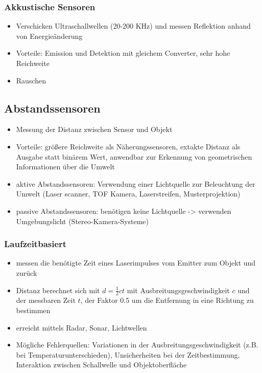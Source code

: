\documentclass[paper=a4, fontsize=11pt]{scrartcl} %
\numberwithin{equation}{section} %
\numberwithin{figure}{section} %
\numberwithin{table}{section} %
\begin{document}
\subsubsection{Akkustische Sensoren}

\begin{itemize}
\item Verschicken Ultraschallwellen (20-200 KHz) und messen Reflektion anhand von Energieänderung
\item Vorteile: Emission und Detektion mit gleichem Converter, sehr hohe Reichweite
\item Rauschen
\end{itemize}

\subsection{Abstandssensoren}

\begin{itemize}
\item Messung der Distanz zwischen Sensor und Objekt
\item Vorteile: größere Reichweite als Näherungssensoren, extakte Distanz als Ausgabe statt binärem Wert, anwendbar zur Erkennung von geometrischen Informationen über die Umwelt
\item aktive Abstandssensoren: Verwendung einer Lichtquelle zur Beleuchtung der Umwelt (Laser scanner, TOF Kamera, Laserstreifen, Musterprojektion)
\item passive Abstandssensoren: benötigen keine Lichtquelle -> verwenden Umgebungslicht (Stereo-Kamera-Systeme)
\end{itemize}

\subsubsection{Laufzeitbasiert}

\begin{itemize}
\item messen die benötigte Zeit eines Laserimpulses vom Emitter zum Objekt und zurück
\item Distanz berechnet sich mit $d = \frac{1}{2} ct$ mit Ausbreitungsgeschwindigkeit $c$ und der messbaren Zeit $t$, der Faktor 0.5 um die Entfernung in eine Richtung zu bestimmen
\item erreicht mittels Radar, Sonar, Lichtwellen
\item Mögliche Fehlerquellen: Variationen in der Ausbreitungsgeschwindigkeit (z.B. bei Temperaturunterschieden), Unsicherheiten bei der Zeitbestimmung, Interaktion zwischen Schallwelle und Objektoberfläche
\end{itemize}
\end{document}
